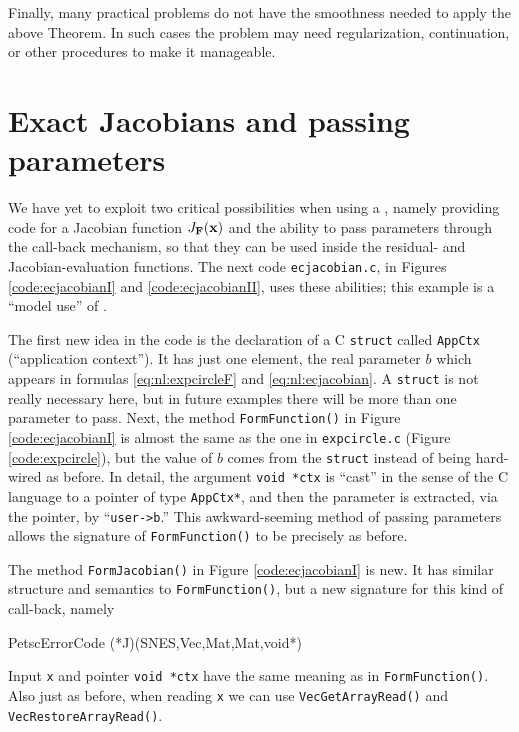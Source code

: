 Finally, many practical problems do not have the smoothness needed to apply the above Theorem.  In such cases the problem may need regularization, continuation, or other procedures to make it manageable.


\section{Exact Jacobians and passing parameters}

We have yet to exploit two critical possibilities when using a \pSNES, namely providing code for a Jacobian function $J_{\mathbf{F}}(\mathbf{x})$ and the ability to pass parameters through the call-back mechanism, so that they can be used inside the residual- and Jacobian-evaluation functions.  The next code \texttt{ecjacobian.c}, in Figures \ref{code:ecjacobianI} and \ref{code:ecjacobianII}, uses these abilities; this example is a ``model use'' of \pSNES.

The first new idea in the code is the declaration of a C \texttt{struct} called \texttt{AppCtx} (``application context'').  It has just one element, the real parameter $b$ which appears in formulas \eqref{eq:nl:expcircleF} and \eqref{eq:nl:ecjacobian}.  A \texttt{struct} is not really necessary here, but in future examples there will be more than one parameter to pass.  Next, the method \texttt{FormFunction()} in Figure \ref{code:ecjacobianI} is almost the same as the one in \texttt{expcircle.c} (Figure \ref{code:expcircle}), but the value of $b$ comes from the \texttt{struct} instead of being hard-wired as before.  In detail, the argument \texttt{void *ctx} is ``cast'' in the sense of the C language \citep{KernighanRitchie1988} to a pointer of type \texttt{AppCtx*}, and then the parameter is extracted, via the pointer, by ``\texttt{user->b}.''  This awkward-seeming method of passing parameters allows the signature of \texttt{FormFunction()} to be precisely as before.


The method \texttt{FormJacobian()} in Figure \ref{code:ecjacobianI} is new.  It has similar structure and semantics to \texttt{FormFunction()}, but a new signature for this kind of call-back, namely
\begin{code}
PetscErrorCode (*J)(SNES,Vec,Mat,Mat,void*)
\end{code}
Input \pVec \texttt{x} and pointer \texttt{void *ctx} have the same meaning as in \texttt{FormFunction()}.  Also just as before, when reading \texttt{x} we can use \texttt{VecGetArrayRead()} and \texttt{VecRestoreArrayRead()}.

